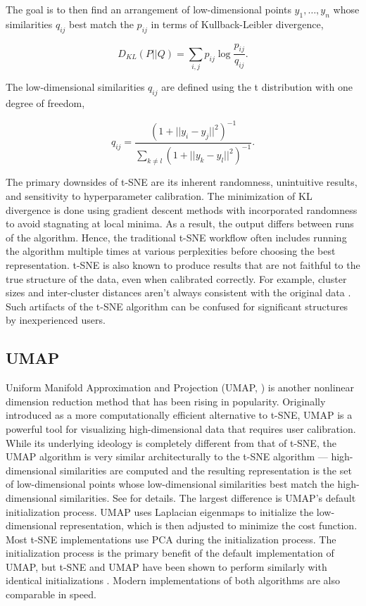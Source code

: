 \documentclass{article}
\begin{document}
The goal is to then find an arrangement of low-dimensional points $y_1, \hdots, y_n$ whose similarities $q_{ij}$ best match the $p_{ij}$ in terms of Kullback-Leibler divergence, \begin{linenomath}$$D_{KL}(P || Q) = \sum_{i,j} p_{ij} \log \frac{p_{ij}}{q_{ij}}.$$\end{linenomath} The low-dimensional similarities $q_{ij}$ are defined using the t distribution with one degree of freedom, \begin{linenomath}$$q_{ij} = \frac{(1 + ||y_i - y_j||^2)^{-1}}{ \sum_{k \neq l} (1 + ||y_k - y_l||^2)^{-1}}.$$\end{linenomath}

The primary downsides of t-SNE are its inherent randomness, unintuitive results, and sensitivity to hyperparameter calibration. The minimization of KL divergence is done using gradient descent methods with incorporated randomness to avoid stagnating at local minima. As a result, the output differs between runs of the algorithm. Hence, the traditional t-SNE workflow often includes running the algorithm multiple times at various perplexities before choosing the best representation. t-SNE is also known to produce results that are not faithful to the true structure of the data, even when calibrated correctly. For example, cluster sizes and inter-cluster distances aren't always consistent with the original data \cite{Distill}. Such artifacts of the t-SNE algorithm can be confused for significant structures by inexperienced users.

\subsection{UMAP}
Uniform Manifold Approximation and Projection (UMAP, \cite{umap}) is another nonlinear dimension reduction method that has been rising in popularity. Originally introduced as a more computationally efficient alternative to t-SNE, UMAP is a powerful tool for visualizing high-dimensional data that requires user calibration. While its underlying ideology is completely different from that of t-SNE, the UMAP algorithm is very similar architecturally to the t-SNE algorithm --- high-dimensional similarities are computed and the resulting representation is the set of low-dimensional points whose low-dimensional similarities best match the high-dimensional similarities. See \cite{umap} for details. The largest difference is UMAP's default initialization process. UMAP uses Laplacian eigenmaps to initialize the low-dimensional representation, which is then adjusted to minimize the cost function. Most t-SNE implementations use PCA during the initialization process. The initialization process is the primary benefit of the default implementation of UMAP, but t-SNE and UMAP have been shown to perform similarly with identical initializations \cite{t-SNE/UMAP example}. Modern implementations of both algorithms are also comparable in speed.
\end{document}

